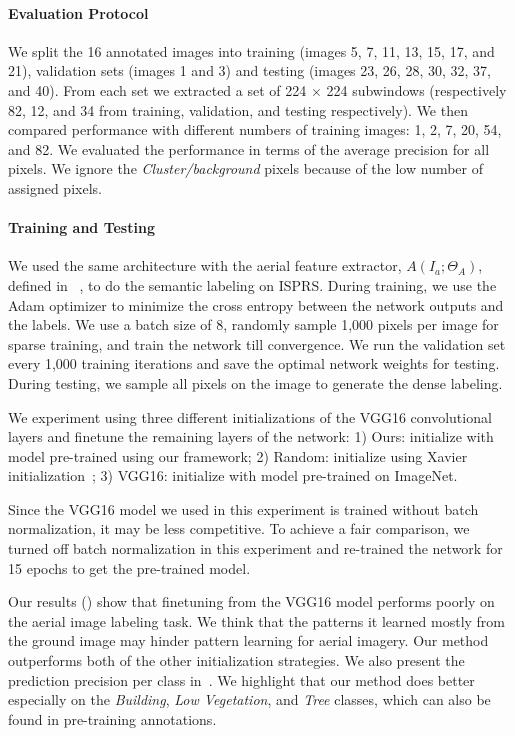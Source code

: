 \paragraph{Evaluation Protocol} We split the 16 annotated images into
training (images 5, 7, 11, 13, 15, 17, and 21), validation sets
(images 1 and 3) and testing (images 23, 26, 28, 30, 32, 37, and 40).
From each set we extracted a set of 224 $\times$ 224 subwindows
(respectively 82, 12, and 34 from training, validation, and testing
respectively).
We then compared performance with different numbers of training
images: 1, 2, 7, 20, 54, and 82. We evaluated the performance in terms
of the average precision for all pixels.  We ignore the
\textit{Cluster/background} pixels because of the low number of
assigned pixels.

\paragraph{Training and Testing} We used the same architecture with
the aerial feature extractor, $A(I_a; \Theta_A)$, defined in
~, to do the semantic labeling on ISPRS.  During
training, we use the Adam optimizer to minimize the cross entropy
between the network outputs and the labels.  We use a batch size of 8,
randomly sample 1,000 pixels per image for sparse training, and train
the network till convergence.  We run the validation set every 1,000 training
iterations and save the optimal network weights for testing.  During
testing, we sample all pixels on the image to generate the dense
labeling.

We experiment using three different initializations of the VGG16
convolutional layers and finetune the remaining layers of the network: 
1) Ours: initialize with model pre-trained using our framework;
2) Random: initialize using Xavier 
initialization~\cite{xavier2010understanding}; 
3) VGG16: initialize with model pre-trained on ImageNet.

Since the VGG16 model we used in this experiment is trained without
batch normalization, it may be less competitive. To achieve a fair
comparison, we turned off batch normalization in this experiment and
re-trained the network for 15 epochs to get the pre-trained model.

Our results () show that finetuning from the 
VGG16 model performs poorly on the aerial image labeling task. We
think that the patterns it learned mostly from the ground image may
hinder pattern learning for aerial imagery. Our method outperforms
both of the other initialization strategies.  We also present the prediction
precision per class in~. We highlight that our method
does better especially on the \textit{Building}, \textit{Low Vegetation}, and
\textit{Tree} classes, which can also be found in pre-training
annotations.


